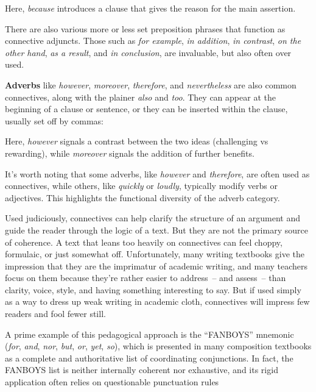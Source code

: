 \z
Here, \textit{because} introduces a clause that gives the reason for the main assertion.

There are also various more or less set preposition phrases that function as connective adjuncts. Those such as \textit{for example}, \textit{in addition}, \textit{in contrast},   \textit{on the other hand}, \textit{as a result}, and \textit{in conclusion}, are invaluable, but also often over used.

\textbf{Adverbs} like \textit{however}, \textit{moreover}, \textit{therefore}, and \textit{nevertheless} are also common connectives, along with the plainer \textit{also} and \textit{too}. They can appear at the beginning of a clause or sentence, or they can be inserted within the clause, usually set off by commas:

\z
Here, \textit{however} signals a contrast between the two ideas (challenging vs rewarding), while \textit{moreover} signals the addition of further benefits.

It's worth noting that some adverbs, like \textit{however} and \textit{therefore}, are often used as connectives, while others, like \textit{quickly} or \textit{loudly}, typically modify verbs or adjectives. This highlights the functional diversity of the adverb category.

Used judiciously, connectives can help clarify the structure of an argument and guide the reader through the logic of a text. But they are not the primary source of coherence. A text that leans too heavily on connectives can feel choppy, formulaic, or just somewhat off.  Unfortunately, many writing textbooks give the impression that they are the imprimatur of academic writing, and many teachers focus on them because they're rather easier to address~-- and assess~-- than clarity, voice, style, and having something interesting to say. But if used simply as a way to dress up weak writing in academic cloth, connectives will impress few readers and fool fewer still.

A prime example of this pedagogical approach is the ``FANBOYS'' mnemonic (\textit{for}, \textit{and}, \textit{nor}, \textit{but}, \textit{or}, \textit{yet}, \textit{so}), which is presented in many composition textbooks as a complete and authoritative list of coordinating conjunctions. In fact, the FANBOYS list is neither internally coherent nor exhaustive, and its rigid application often relies on questionable punctuation rules \citep{Reynolds2011}


